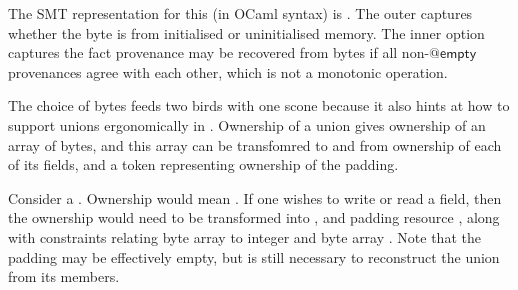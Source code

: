 The SMT representation for this (in OCaml syntax) is
. The outer
 captures whether the byte is from initialised or
uninitialised memory. The inner option captures the fact provenance may be
recovered from bytes if all non-$@\mathsf{empty}$ provenances agree with each
other, which is not a monotonic operation.

The choice of bytes feeds two birds with one scone because it also hints at how
to support unions ergonomically in . Ownership of a union gives
ownership of an array of bytes, and this array can be transfomred to and from
ownership of each of its fields, and a token representing ownership of the
padding.

Consider a .
Ownership  would mean . %
If one wishes to write or read a field, then the ownership would need to
be transformed into , and %
padding resource , along with %
constraints relating byte array  to integer  and byte
array . Note that the padding may be effectively empty, but is
still necessary to reconstruct the union from its members.


